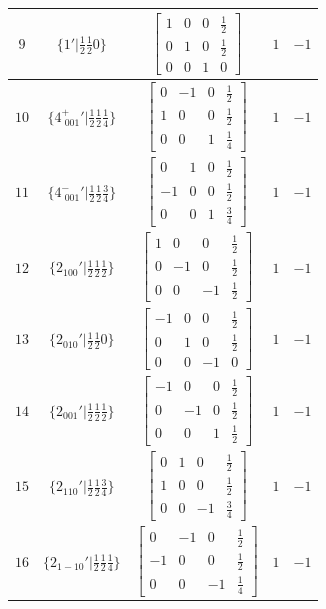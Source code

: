 \documentclass[fleqn,8pt]{jsarticle}
\begin{document}
\begin{longtable}{ccccc}
$ 9 $ & $ \{1{}'|\frac{1}{2} \frac{1}{2} 0\} $ & $ \begin{bmatrix} 1 & 0 & 0 & \frac{1}{2} \\ 0 & 1 & 0 & \frac{1}{2} \\ 0 & 0 & 1 & 0 \end{bmatrix} $ & $ 1 $ & $ -1 $ \\ \hline
$ 10 $ & $ \{4^{+}_{\,\,001}{}'|\frac{1}{2} \frac{1}{2} \frac{1}{4}\} $ & $ \begin{bmatrix} 0 & -1 & 0 & \frac{1}{2} \\ 1 & 0 & 0 & \frac{1}{2} \\ 0 & 0 & 1 & \frac{1}{4} \end{bmatrix} $ & $ 1 $ & $ -1 $ \\ \hline
$ 11 $ & $ \{4^{-}_{\,\,001}{}'|\frac{1}{2} \frac{1}{2} \frac{3}{4}\} $ & $ \begin{bmatrix} 0 & 1 & 0 & \frac{1}{2} \\ -1 & 0 & 0 & \frac{1}{2} \\ 0 & 0 & 1 & \frac{3}{4} \end{bmatrix} $ & $ 1 $ & $ -1 $ \\ \hline
$ 12 $ & $ \{2{}_{100}{}'|\frac{1}{2} \frac{1}{2} \frac{1}{2}\} $ & $ \begin{bmatrix} 1 & 0 & 0 & \frac{1}{2} \\ 0 & -1 & 0 & \frac{1}{2} \\ 0 & 0 & -1 & \frac{1}{2} \end{bmatrix} $ & $ 1 $ & $ -1 $ \\ \hline
$ 13 $ & $ \{2{}_{010}{}'|\frac{1}{2} \frac{1}{2} 0\} $ & $ \begin{bmatrix} -1 & 0 & 0 & \frac{1}{2} \\ 0 & 1 & 0 & \frac{1}{2} \\ 0 & 0 & -1 & 0 \end{bmatrix} $ & $ 1 $ & $ -1 $ \\ \hline
$ 14 $ & $ \{2{}_{001}{}'|\frac{1}{2} \frac{1}{2} \frac{1}{2}\} $ & $ \begin{bmatrix} -1 & 0 & 0 & \frac{1}{2} \\ 0 & -1 & 0 & \frac{1}{2} \\ 0 & 0 & 1 & \frac{1}{2} \end{bmatrix} $ & $ 1 $ & $ -1 $ \\ \hline
$ 15 $ & $ \{2{}_{110}{}'|\frac{1}{2} \frac{1}{2} \frac{3}{4}\} $ & $ \begin{bmatrix} 0 & 1 & 0 & \frac{1}{2} \\ 1 & 0 & 0 & \frac{1}{2} \\ 0 & 0 & -1 & \frac{3}{4} \end{bmatrix} $ & $ 1 $ & $ -1 $ \\ \hline
$ 16 $ & $ \{2{}_{1-10}{}'|\frac{1}{2} \frac{1}{2} \frac{1}{4}\} $ & $ \begin{bmatrix} 0 & -1 & 0 & \frac{1}{2} \\ -1 & 0 & 0 & \frac{1}{2} \\ 0 & 0 & -1 & \frac{1}{4} \end{bmatrix} $ & $ 1 $ & $ -1 $ \\
\end{longtable}
\end{document}
